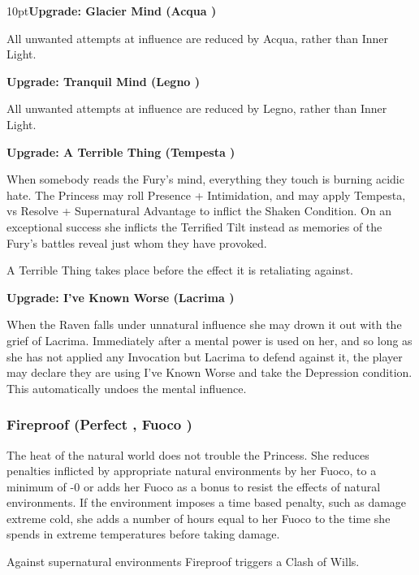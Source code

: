 \begin{myindentpar}{10pt}\textbf{Upgrade: Glacier Mind (Acqua \textbullet)}

All unwanted attempts at influence  are reduced by Acqua, rather than Inner Light. 

\textbf{Upgrade: Tranquil Mind (Legno \textbullet)}

All unwanted attempts at influence  are reduced by Legno, rather than Inner Light. 

\textbf{Upgrade: A Terrible Thing (Tempesta \textbullet\textbullet\textbullet)}

When somebody reads the Fury's mind, everything they touch is burning acidic hate. The Princess may roll Presence + Intimidation, and may apply Tempesta, vs Resolve + Supernatural Advantage to inflict the Shaken Condition. On an exceptional success she inflicts the Terrified Tilt instead as memories of the Fury's battles reveal just whom they have provoked. 

A Terrible Thing takes place before the effect it is retaliating against. 

\textbf{Upgrade: I've Known Worse (Lacrima \textbullet\textbullet\textbullet\textbullet)}

When the Raven falls under unnatural influence she may drown it out with the grief of Lacrima. Immediately after a mental power is used on her, and so long as she has not applied any Invocation but Lacrima to defend against it, the player may declare they are using I've Known Worse and take the Depression condition. This automatically undoes the mental influence.

\end{myindentpar}


\subsubsection*{Fireproof (Perfect \textbullet, Fuoco \textbullet)}

The heat of the natural world does not trouble the Princess. She reduces penalties inflicted by appropriate natural environments by her Fuoco, to a minimum of -0 or adds her Fuoco as a bonus to resist the effects of natural environments. If the environment imposes a time based penalty, such as damage extreme cold, she adds a number of hours equal to her Fuoco to the time she spends in extreme temperatures before taking damage.

Against supernatural environments Fireproof triggers a Clash of Wills.

